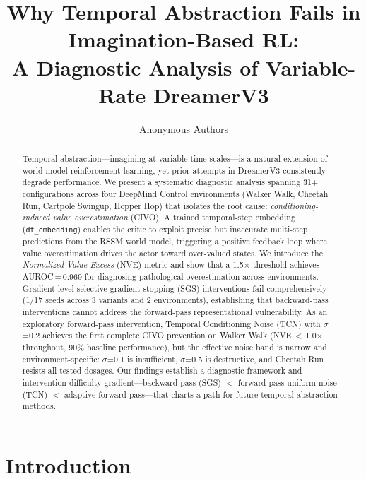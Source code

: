 \documentclass{article}
\title{Why Temporal Abstraction Fails in Imagination-Based RL:\\A Diagnostic Analysis of Variable-Rate DreamerV3}
\author{Anonymous Authors}
\begin{document}
\maketitle

\begin{abstract}
Temporal abstraction---imagining at variable time scales---is a natural extension of world-model reinforcement learning, yet prior attempts in DreamerV3 consistently degrade performance.
We present a systematic diagnostic analysis spanning 31+ configurations across four DeepMind Control environments (Walker Walk, Cheetah Run, Cartpole Swingup, Hopper Hop) that isolates the root cause: \emph{conditioning-induced value overestimation} (CIVO).
A trained temporal-step embedding (\texttt{dt\_embedding}) enables the critic to exploit precise but inaccurate multi-step predictions from the RSSM world model, triggering a positive feedback loop where value overestimation drives the actor toward over-valued states.
We introduce the \emph{Normalized Value Excess} (NVE) metric and show that a 1.5$\times$ threshold achieves AUROC\,=\,0.969 for diagnosing pathological overestimation across environments.
Gradient-level selective gradient stopping (SGS) interventions fail comprehensively (1/17 seeds across 3 variants and 2 environments), establishing that backward-pass interventions cannot address the forward-pass representational vulnerability.
As an exploratory forward-pass intervention, Temporal Conditioning Noise (TCN) with $\sigma$=0.2 achieves the first complete CIVO prevention on Walker Walk (NVE\,$<$\,1.0$\times$ throughout, 90\% baseline performance), but the effective noise band is narrow and environment-specific: $\sigma$=0.1 is insufficient, $\sigma$=0.5 is destructive, and Cheetah Run resists all tested dosages.
Our findings establish a diagnostic framework and intervention difficulty gradient---backward-pass (SGS) $<$ forward-pass uniform noise (TCN) $<$ adaptive forward-pass---that charts a path for future temporal abstraction methods.
\end{abstract}

\section{Introduction}
\end{document}
